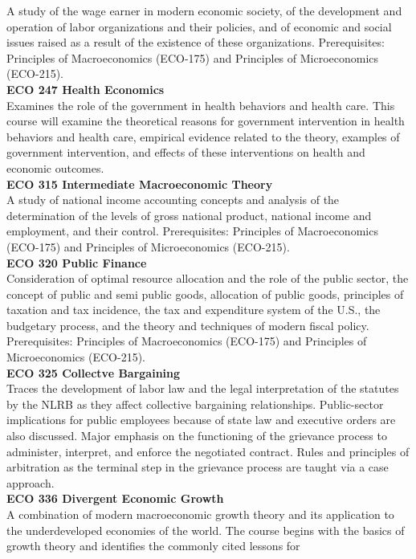 \documentclass[
  letterpaper,
]{scrbook}
\begin{document}
A study of the wage earner in modern economic society, of the
development and operation of labor organizations and their policies, and
of economic and social issues raised as a result of the existence of
these organizations. Prerequisites: Principles of Macroeconomics
(ECO-175) and Principles of Microeconomics (ECO-215).\\
\textbf{ECO 247 Health Economics}\\
Examines the role of the government in health behaviors and health care.
This course will examine the theoretical reasons for government
intervention in health behaviors and health care, empirical evidence
related to the theory, examples of government intervention, and effects
of these interventions on health and economic outcomes.\\
\textbf{ECO 315 Intermediate Macroeconomic Theory}\\
A study of national income accounting concepts and analysis of the
determination of the levels of gross national product, national income
and employment, and their control. Prerequisites: Principles of
Macroeconomics (ECO-175) and Principles of Microeconomics (ECO-215).\\
\textbf{ECO 320 Public Finance}\\
Consideration of optimal resource allocation and the role of the public
sector, the concept of public and semi public goods, allocation of
public goods, principles of taxation and tax incidence, the tax and
expenditure system of the U.S., the budgetary process, and the theory
and techniques of modern fiscal policy. Prerequisites: Principles of
Macroeconomics (ECO-175) and Principles of Microeconomics (ECO-215).\\
\textbf{ECO 325 Collectve Bargaining}\\
Traces the development of labor law and the legal interpretation of the
statutes by the NLRB as they affect collective bargaining relationships.
Public-sector implications for public employees because of state law and
executive orders are also discussed. Major emphasis on the functioning
of the grievance process to administer, interpret, and enforce the
negotiated contract. Rules and principles of arbitration as the terminal
step in the grievance process are taught via a case approach.\\
\textbf{ECO 336 Divergent Economic Growth}\\
A combination of modern macroeconomic growth theory and its application
to the underdeveloped economies of the world. The course begins with the
basics of growth theory and identifies the commonly cited lessons for
\end{document}
